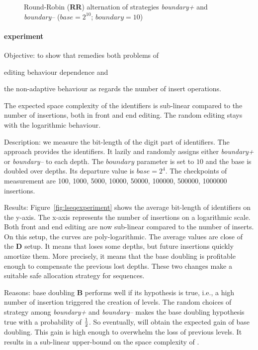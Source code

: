 \begin{figure}
\small
\begin{center}

\caption{Round-Robin (\textbf{RR}) alternation of strategies \emph{boundary+}
  and \emph{boundary--} ($base=2^{10}$; $boundary=10$)}
\label{fig:roundrobinexperiment}
\end{center}
\end{figure}


\paragraph{\textbf{\NAME{}} experiment}

\begin{asparadesc}
\item[Objective:] to show that \NAME{} remedies both problems of
  \begin{inparaenum}[(i)]
  \item editing behaviour dependence and
  \item the non-adaptive behaviour as regards the number of insert operations.
  \end{inparaenum}
  The expected space complexity of the identifiers is sub-linear compared to
  the number of insertions, both in front and end editing. The random editing
  stays with the logarithmic behaviour.

\item[Description:] we measure the bit-length of the digit part of
  identifiers. The \NAME{} approach provides the identifiers. It lazily and
  randomly assigns either \emph{boundary+} or \emph{boundary--} to each
  depth. The $boundary$ parameter is set to $10$ and the base is doubled over
  depths. Its departure value is $base=2^{4}$. The checkpoints of measurement
  are 100, 1000, 5000, 10000, 50000, 100000, 500000, 1000000 insertions.
  
\item[Results:] Figure~\ref{fig:lseqexperiment} shows the average bit-length of
  \textbf{\NAME{}} identifiers on the y-axis. The x-axis represents the number
  of insertions on a logarithmic scale. Both front and end editing are now
  sub-linear compared to the number of inserts. On this setup, the curves are
  poly-logarithmic. The average values are close of the \textbf{D} setup. It
  means that \NAME{} loses some depths, but future insertions quickly amortize
  them. More precisely, it means that the base doubling is profitable enough to
  compensate the previous lost depths. These two changes make \NAME{} a
  suitable safe allocation strategy for sequences.

\item[Reasons:] base doubling \textbf{B} performs well if its hypothesis is
  true, i.e., a high number of insertion triggered the creation of levels. The
  random choices of strategy among \emph{boundary+} and \emph{boundary--} makes
  the base doubling hypothesis true with a probability of $1 \over{2}$. So
  eventually, \textbf{\NAME{}} will obtain the expected gain of base
  doubling. This gain is high enough to overwhelm the loss of previous
  levels. It results in a sub-linear upper-bound on the space complexity of
  \textbf{\NAME{}}.
\end{asparadesc}

